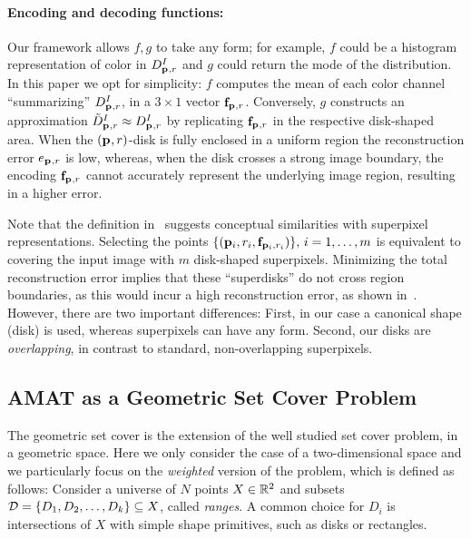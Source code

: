 \documentclass[10pt,twocolumn,letterpaper]{article}
\begin{document}
\paragraph{Encoding and decoding functions:}
Our framework allows $f,g$ to take any form; 
for example, $f$ could be a histogram representation of color in $D_{\mathbf{p}_{},r}^I$ and $g$ could return the mode of the distribution.
In this paper we opt for simplicity:
$f$ computes the mean of each color channel ``summarizing'' $D_{\mathbf{p}_{},r}^I$, in a $3\times1$ vector $\mathbf{f}_{\mathbf{p}_{},r}$.
Conversely, $g$ constructs an approximation $\tilde{D}_{\mathbf{p}_{},r}^I \approx D_{\mathbf{p}_{},r}^I$ by replicating $\mathbf{f}_{\mathbf{p}_{},r}$ in the
respective disk-shaped area.
When the $(\mathbf{p}_{},r)$-disk is fully enclosed in a uniform region the reconstruction error $e_{\mathbf{p}_{},r}$
is low, whereas, when the disk crosses a strong image boundary, the encoding $\mathbf{f}_{\mathbf{p}_{},r}$ cannot accurately represent
the underlying image region, resulting in a higher error. 

Note that the definition in~ suggests conceptual similarities with superpixel representations.
Selecting the points $\{ (\mathbf{p}_{i},r_i,\mathbf{f}_{\mathbf{p}_{i},r_i}) \},\,i=1,\ldots,m$ is equivalent to covering the input image
with $m$ disk-shaped superpixels. Minimizing the total reconstruction error implies that these ``superdisks'' do not
cross region boundaries, as this would incur a high reconstruction error, as shown in~.
However, there are two important differences:
First, in our case a canonical shape (disk) is used, whereas superpixels can have any form. 
Second, our disks are \emph{overlapping}, in contrast to standard, non-overlapping superpixels.

\subsection{AMAT as a Geometric Set Cover Problem}\label{sec:method:wgsc}
The geometric set cover is the extension of the well studied set cover problem, in a geometric space.
Here we only consider the case of a two-dimensional space and we particularly focus on the 
\emph{weighted} version of the problem, which is defined as follows:
Consider a universe of $N$ points $X \in \mathbb{R}^2$ and subsets
$\mathcal{D} = \{D_1,D_2,\ldots,D_k\} \subseteq X$, called \emph{ranges}. 
A common choice for $D_i$ is intersections of $X$ with simple shape primitives, such as disks or rectangles.
\end{document}
